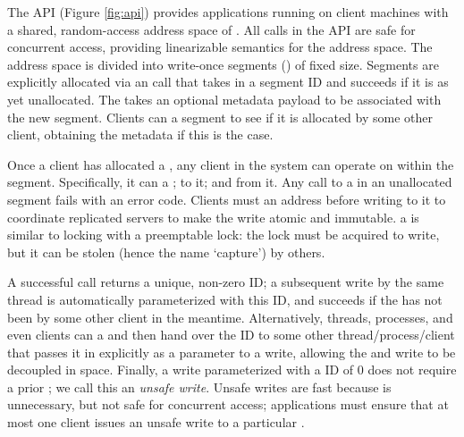 The \sysname{} API (Figure \ref{fig:api}) provides applications running on client machines with a shared, random-access address space of \WORs{}. All calls in the \sysname{} API are safe for concurrent access, providing linearizable semantics for the address space. The address space is divided into write-once segments (\WOSes{}) of fixed size\cuttext{; i.e., \WOS{} \#0 contains \WORs{} [0-100), \#1 contains [100-200), and so on}. Segments are explicitly allocated via an  call that takes in a segment ID and succeeds if it is as yet unallocated. The  takes an optional metadata payload to be associated with the new segment. Clients can  a segment to see if it is allocated by some other client, obtaining the metadata if this is the case. 

Once a client has allocated a \WOS{}, any client in the system can operate on \WORs{} within the segment. Specifically, it can \api{\prepare{}} a \WOR{};  to it; and  from it. Any call to a \WOR{} in an unallocated segment fails with an error code. 
Clients must \prepare{} an address before writing to it to coordinate replicated servers to make the write atomic and immutable.
\Preparing{} a \WOR{} is similar to locking with a preemptable lock: the lock must be acquired to write, but it can be stolen (hence the name `capture') by others.

A successful \prepare{} call returns a unique, non-zero \prepare{}ID; a subsequent write by the same thread is automatically parameterized with this ID, and succeeds if the \WOR{} has not been \prepared{} by some other client in the meantime. Alternatively, threads, processes, and even clients can \prepare{} a \WOR{} and then hand over the \prepare{}ID to some other thread/process/client that passes it in explicitly as a parameter to a write, allowing the \prepare{} and write to be decoupled in space. Finally, a write parameterized with a \prepare{}ID of 0 does not require a prior \prepare{}; we call this an \textit{unsafe write}. 
Unsafe writes are fast because \preparing{} is unnecessary, but not safe for concurrent access; applications must ensure that at most one client issues an unsafe write to a particular \WOR{}.

